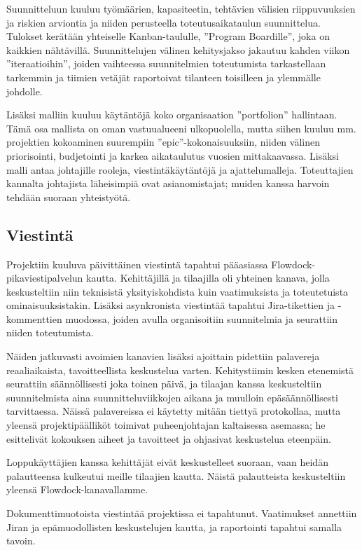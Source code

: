 \documentclass{article}
\begin{document}
Suunnitteluun kuuluu työmäärien, kapasiteetin, tehtävien välisien
riippuvuuksien ja riskien arviontia ja niiden perusteella
toteutus\-aika\-taulun suunnittelua. Tulokset kerätään yhtei\-selle
Kanban-taululle, ''Program Boardille'', joka on kaikkien nähtävillä.
Suunnittelujen välinen kehitysjakso jakautuu kahden viikon ''iteraatioihin'',
joiden vaihteessa suunnitelmien toteutumista tarkastellaan tarkemmin ja
tii\-mien vetä\-jät raportoivat tilanteen toisilleen ja ylemmälle johdolle.

Lisäksi malliin kuuluu käytäntöjä koko organisaation ''portfolion'' hallintaan.
Tämä osa mallista on oman vastuualueeni ulkopuolella, mutta siihen kuuluu mm.
projektien kokoaminen suurempiin ''epic''-kokonaisuuksiin, niiden välinen
priorisointi, budjetointi ja karkea aikataulutus vuosien mittakaavassa. Lisäksi
malli antaa johtajille rooleja, vies\-tintäkäytäntöjä ja ajattelumalleja.
Toteuttajien kannalta johtajista läheisimpiä ovat asianomistajat; muiden kanssa
harvoin tehdään suoraan yhteistyötä.

\subsection{Viestintä}

Projektiin kuuluva päivittäinen viestintä tapahtui pääasiassa
Flowdock-pikaviestipalvelun kautta. Kehittäjillä ja tilaajilla oli yhteinen
kanava, jolla keskusteltiin niin teknisistä yksityiskohdista kuin vaatimuksista
ja toteutetuista ominaisuuksistakin. Lisäksi asynkronista viestintää tapahtui
Jira-tikettien ja -kommenttien muodossa, joiden avulla organisoitiin
suunnitelmia ja seurattiin niiden toteutumista.

Näiden jatkuvasti avoimien kanavien lisäksi ajoittain pidettiin palavereja
reaaliaikaista, tavoitteellista keskustelua varten. Kehitystiimin kesken
etenemistä seurattiin säännöllisesti joka toinen päivä, ja tilaajan kanssa
keskusteltiin suunnitelmista aina suunnitteluviikkojen aikana ja muulloin
epäsäännöllisesti tarvittaessa. Näissä palavereissa ei käytetty mitään tiettyä
protokollaa, mutta yleensä projektipäälliköt toimivat puheenjohtajan
kaltaisessa asemassa; he esittelivät kokouksen aiheet ja tavoitteet ja
ohjasivat keskustelua eteenpäin.

Loppukäyttäjien kanssa kehittäjät eivät keskustelleet suoraan, vaan heidän
palautteensa kulkeutui meille tilaajien kautta. Näistä palautteista
keskusteltiin yleensä Flowdock-kanavallamme.

Dokumenttimuotoista viestintää projektissa ei tapahtunut. Vaatimukset annettiin
Jiran ja epämuodollisten keskustelujen kautta, ja raportointi tapahtui samalla
tavoin.
\end{document}
